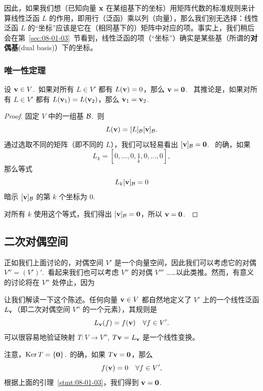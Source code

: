 因此，如果我们想（已知向量 $\mathbf{x}$ 在某组基下的坐标）用矩阵代数的标准规则来计算线性泛函 $L$ 的作用，即用行（泛函）乘以列（向量），那么我们别无选择：线性泛函 $L$ 的“坐标”应该是它在（相同基下的）矩阵中对应的项。事实上，我们稍后会在第~\ref{sec:08-01-03}~节看到，线性泛函的项（“坐标”）确实是某些基（所谓的\textbf{对偶基}(dual basis)）下的坐标。

\subsubsection{唯一性定理}\label{sec:08-01-01-02}

\begin{lemma}\label{stmt:08-01-03} 设 $\mathbf{v} \in V$.~如果对所有 $L \in V'$ 都有 $L(\mathbf{v}) = 0$，那么 $\mathbf{v} = \mathbf{0}$.~
其推论是，如果对所有 $L \in V'$ 都有 $L(\mathbf{v}_1) = L(\mathbf{v}_2)$，那么 $\mathbf{v}_1 = \mathbf{v}_2$.\end{lemma}

\begin{proof}
固定 $V$ 中的一组基 $\mathcal{B}$.~则 $$L(\mathbf{v}) = [L]_{\mathcal{B}} [\mathbf{v}]_{\mathcal{B}}.$$
通过选取不同的矩阵（即不同的 $L$），我们可以轻易看出 $[\mathbf{v}]_{\mathcal{B}} = \mathbf{0}$.~
的确，如果
$$L_k = [0, \dots, 0, \underset{k}{1}, 0, \dots, 0],$$
那么等式 $$L_k [\mathbf{v}]_{\mathcal{B}} = 0$$ 暗示 $[\mathbf{v}]_{\mathcal{B}}$ 的第 $k$ 个坐标为 0.

对所有 $k$ 使用这个等式，我们得出 $[\mathbf{v}]_{\mathcal{B}} = \mathbf{0}$，所以 $\mathbf{v} = \mathbf{0}$.~\end{proof}

\subsection{二次对偶空间}\label{sec:08-01-02}
正如我们上面讨论的，对偶空间 $V'$ 是一个向量空间，因此我们可以考虑它的对偶 $V'' = (V')'$.~看起来我们也可以考虑 $V''$ 的对偶 $V'''$ ……以此类推。然而，有意义的讨论将在 $V''$ 处停止，因为


让我们解读一下这个陈述。任何向量 $\mathbf{v} \in V$ 都自然地定义了 $V'$ 上的一个线性泛函 $L_{\mathbf{v}}$（即二次对偶空间 $V''$ 的一个元素），其规则是 $$L_{\mathbf{v}}(f) = f(\mathbf{v})\quad \forall f \in V'.$$
可以很容易地验证映射 $T: V \to V''$, $T\mathbf{v} = L_{\mathbf{v}}$ 是一个线性变换。

注意，$\operatorname{Ker} T = \{\mathbf{0}\}$.~的确，如果 $T\mathbf{v} = \mathbf{0}$，那么 $$f(\mathbf{v}) = 0 \quad \forall f \in V',$$
根据上面的引理~\ref{stmt:08-01-03}，我们得到 $\mathbf{v} = \mathbf{0}$.~

